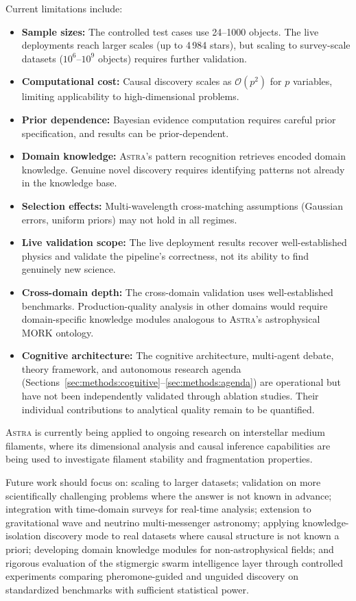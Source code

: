 \documentclass[usenatbib]{rasti}
\newcommand{\astra}{\textsc{Astra}\xspace}
\begin{document}
Current limitations include:
\begin{itemize}
  \item \textbf{Sample sizes:} The controlled test cases use 24--1000 objects. The live deployments reach larger scales (up to 4\,984 stars), but scaling to survey-scale datasets ($10^{6}$--$10^{9}$ objects) requires further validation.
  \item \textbf{Computational cost:} Causal discovery scales as $\mathcal{O}(p^2)$ for $p$ variables, limiting applicability to high-dimensional problems.
  \item \textbf{Prior dependence:} Bayesian evidence computation requires careful prior specification, and results can be prior-dependent.
  \item \textbf{Domain knowledge:} \astra's pattern recognition retrieves encoded domain knowledge. Genuine novel discovery requires identifying patterns not already in the knowledge base.
  \item \textbf{Selection effects:} Multi-wavelength cross-matching assumptions (Gaussian errors, uniform priors) may not hold in all regimes.
  \item \textbf{Live validation scope:} The live deployment results recover well-established physics and validate the pipeline's correctness, not its ability to find genuinely new science.
  \item \textbf{Cross-domain depth:} The cross-domain validation uses well-established benchmarks. Production-quality analysis in other domains would require domain-specific knowledge modules analogous to \astra's astrophysical MORK ontology.
  \item \textbf{Cognitive architecture:} The cognitive architecture, multi-agent debate, theory framework, and autonomous research agenda (Sections~\ref{sec:methods:cognitive}--\ref{sec:methods:agenda}) are operational but have not been independently validated through ablation studies. Their individual contributions to analytical quality remain to be quantified.
\end{itemize}

\astra is currently being applied to ongoing research on interstellar medium filaments, where its dimensional analysis and causal inference capabilities are being used to investigate filament stability and fragmentation properties.

Future work should focus on: scaling to larger datasets; validation on more scientifically challenging problems where the answer is not known in advance; integration with time-domain surveys for real-time analysis; extension to gravitational wave and neutrino multi-messenger astronomy; applying knowledge-isolation discovery mode to real datasets where causal structure is not known a priori; developing domain knowledge modules for non-astrophysical fields; and rigorous evaluation of the stigmergic swarm intelligence layer through controlled experiments comparing pheromone-guided and unguided discovery on standardized benchmarks with sufficient statistical power.
\end{document}
